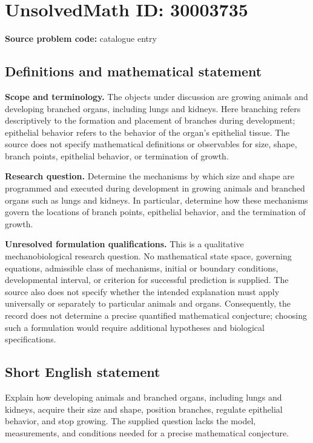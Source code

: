 \documentclass[11pt]{article}
\begin{document}
\section*{UnsolvedMath ID: 30003735}
\textbf{Source problem code:} catalogue entry
\subsection{Definitions and mathematical statement}
\textbf{Scope and terminology.} The objects under discussion are growing animals and developing branched organs, including lungs and kidneys. Here branching refers descriptively to the formation and placement of branches during development; epithelial behavior refers to the behavior of the organ's epithelial tissue. The source does not specify mathematical definitions or observables for size, shape, branch points, epithelial behavior, or termination of growth.

\textbf{Research question.} Determine the mechanisms by which size and shape are programmed and executed during development in growing animals and branched organs such as lungs and kidneys. In particular, determine how these mechanisms govern the locations of branch points, epithelial behavior, and the termination of growth.

\textbf{Unresolved formulation qualifications.} This is a qualitative mechanobiological research question. No mathematical state space, governing equations, admissible class of mechanisms, initial or boundary conditions, developmental interval, or criterion for successful prediction is supplied. The source also does not specify whether the intended explanation must apply universally or separately to particular animals and organs. Consequently, the record does not determine a precise quantified mathematical conjecture; choosing such a formulation would require additional hypotheses and biological specifications.
\subsection{Short English statement}
Explain how developing animals and branched organs, including lungs and kidneys, acquire their size and shape, position branches, regulate epithelial behavior, and stop growing. The supplied question lacks the model, measurements, and conditions needed for a precise mathematical conjecture.
\end{document}
